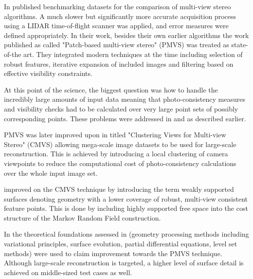 \documentclass{ucl_thesis}
\begin{document}
In \cite{Strecha:2008} published benchmarking datasets for the comparison of multi-view stereo algorithms. A much slower but significantly more accurate acquisition process using a LIDAR time-of-flight scanner was applied, and error measures were defined appropriately. In their work, besides their own earlier algorithms \cite{strecha2004wide} \cite{strecha2006combined} the work published as \cite{FurukawaP07} called "Patch-based multi-view stereo" (PMVS) was treated as state-of-the art. They integrated modern techniques at the time including selection of robust features, iterative expansion of included images and filtering based on effective visibility constraints.

\par At this point of the science, the biggest question was how to handle the incredibly large amounts of input data meaning that photo-consistency measures and visibility checks had to be calculated over very large point sets of possibly corresponding points. These problems were addressed in \cite{agarwal2010bundle} and \cite{AgarwalFSSCSS11} as described earlier.

\par PMVS was later improved upon in \cite{FurukawaCSS10} titled "Clustering Views for Multi-view Stereo" (CMVS) allowing mega-scale image datasets to be used for large-scale reconstruction. This is achieved by introducing a local clustering of camera viewpoints to reduce the computational cost of photo-consistency calculations over the whole input image set.

\par \cite{Jancosek:2011} improved on the CMVS technique by introducing the term weakly supported surfaces denoting geometry with a lower coverage of robust, multi-view consistent feature points. This is done by including highly supported free space into the cost structure of the Markov Random Field construction.

\par In \cite{HHVu:2011} the theoretical foundations assessed in \cite{faugeras2002variational} (geometry processing methods including variational principles, surface evolution, partial differential equations, level set methods) were used to claim improvement towards the PMVS technique. Although large-scale reconstruction is targeted, a higher level of surface detail is achieved on middle-sized test cases as well.
\end{document}
